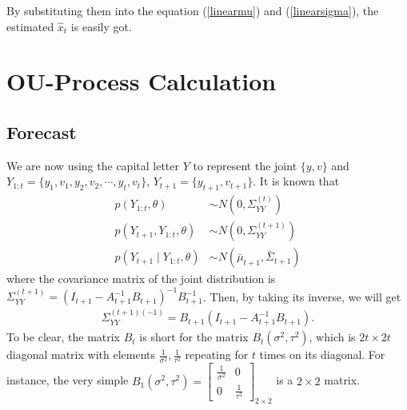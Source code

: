 By substituting them into the equation (\ref{linearmu}) and (\ref{linearsigma}), the estimated $\hat{x}_t$ is easily got. 




\section{OU-Process Calculation}\label{OUcalculation}

\subsection*{Forecast}
We are now using the capital letter $Y$ to represent the joint $\{y,v\}$ and $Y_{1:t} = \{y_1,v_1,y_2,v_2,\cdots, y_t, v_t \}$, $Y_{t+1} = \{y_{t+1}, v_{t+1}\}$. It is known that 
\begin{align*}
p(Y_{1:t},\theta) &\sim N\left( 0,\Sigma_{YY}^{(t)} \right)\\
p(Y_{t+1},Y_{1:t},\theta) &\sim N\left( 0,\Sigma_{YY}^{(t+1)} \right)\\
p(Y_{t+1}\mid Y_{1:t},\theta) &\sim N\left( \bar{\mu}_{t+1},\bar{\Sigma}_{t+1} \right)
\end{align*}
where the covariance matrix of the joint distribution is $\Sigma_{YY}^{(t+1)} = (I_{t+1}-A_{t+1}^{-1}B_{t+1})^{-1}B_{t+1}^{-1}$. Then, by taking its inverse, we will get
\begin{align*}
\Sigma_{YY}^{(t+1) (-1)} = B_{t+1}(I_{t+1}-A_{t+1}^{-1}B_{t+1}).
\end{align*}
To be clear, the matrix $B_t$ is short for the matrix $B_t(\sigma^2,\tau^2)$, which is $2t\times 2t$ diagonal matrix with elements $\frac{1}{\sigma^2},\frac{1}{\tau^2}$ repeating for $t$ times on its diagonal. For instance, the very simple $B_1(\sigma^2,\tau^2) = 
\begin{bmatrix}
\frac{1}{\sigma^2} & 0  \\
0 & \frac{1}{\tau^2}
\end{bmatrix}_{2\times 2}$ is a $2\times 2$ matrix. 

